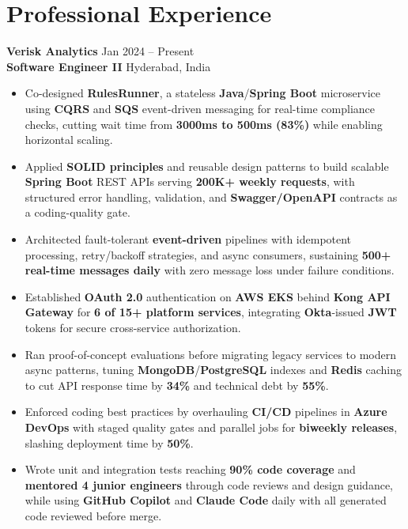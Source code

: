 \documentclass[a4paper,10pt]{article}
\begin{document}
\section*{Professional Experience}

\textbf{Verisk Analytics} \hfill Jan 2024 -- Present \\
\textbf{Software Engineer II} \hfill Hyderabad, India

\begin{itemize}[leftmargin=*]
    \item Co-designed \textbf{RulesRunner}, a stateless \textbf{Java}/\textbf{Spring Boot} microservice using \textbf{CQRS} and \textbf{SQS} event-driven messaging for real-time compliance checks, cutting wait time from \textbf{3000ms to 500ms (83\%)} while enabling horizontal scaling.
    \item Applied \textbf{SOLID principles} and reusable design patterns to build scalable \textbf{Spring Boot} REST APIs serving \textbf{200K+ weekly requests}, with structured error handling, validation, and \textbf{Swagger/OpenAPI} contracts as a coding-quality gate.
    \item Architected fault-tolerant \textbf{event-driven} pipelines with idempotent processing, retry/backoff strategies, and async consumers, sustaining \textbf{500+ real-time messages daily} with zero message loss under failure conditions.
    \item Established \textbf{OAuth 2.0} authentication on \textbf{AWS EKS} behind \textbf{Kong API Gateway} for \textbf{6 of 15+ platform services}, integrating \textbf{Okta}-issued \textbf{JWT} tokens for secure cross-service authorization.
    \item Ran proof-of-concept evaluations before migrating legacy services to modern async patterns, tuning \textbf{MongoDB}/\textbf{PostgreSQL} indexes and \textbf{Redis} caching to cut API response time by \textbf{34\%} and technical debt by \textbf{55\%}.
    \item Enforced coding best practices by overhauling \textbf{CI/CD} pipelines in \textbf{Azure DevOps} with staged quality gates and parallel jobs for \textbf{biweekly releases}, slashing deployment time by \textbf{50\%}.
    \item Wrote unit and integration tests reaching \textbf{90\% code coverage} and \textbf{mentored 4 junior engineers} through code reviews and design guidance, while using \textbf{GitHub Copilot} and \textbf{Claude Code} daily with all generated code reviewed before merge.
\end{itemize}
\end{document}
